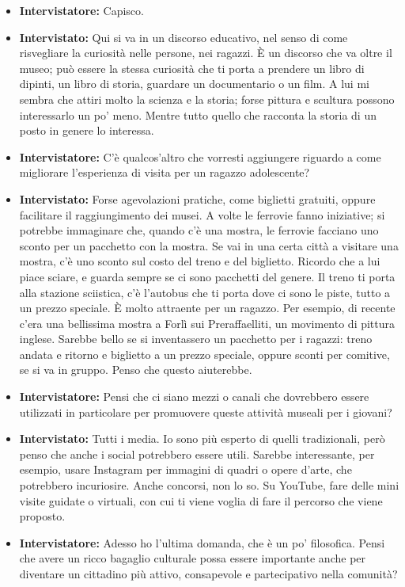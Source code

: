 \documentclass{article}
\begin{document}
\begin{itemize}
    \item \textbf{Intervistatore:} Capisco.
    \item \textbf{Intervistato:} Qui si va in un discorso educativo, nel senso di come risvegliare la curiosità nelle persone, nei ragazzi. È un discorso che va oltre il museo; può essere la stessa curiosità che ti porta a prendere un libro di dipinti, un libro di storia, guardare un documentario o un film. A lui mi sembra che attiri molto la scienza e la storia; forse pittura e scultura possono interessarlo un po' meno. Mentre tutto quello che racconta la storia di un posto in genere lo interessa.
    \item \textbf{Intervistatore:} C'è qualcos'altro che vorresti aggiungere riguardo a come migliorare l'esperienza di visita per un ragazzo adolescente?
    \item \textbf{Intervistato:} Forse agevolazioni pratiche, come biglietti gratuiti, oppure facilitare il raggiungimento dei musei. A volte le ferrovie fanno iniziative; si potrebbe immaginare che, quando c'è una mostra, le ferrovie facciano uno sconto per un pacchetto con la mostra. Se vai in una certa città a visitare una mostra, c'è uno sconto sul costo del treno e del biglietto. Ricordo che a lui piace sciare, e guarda sempre se ci sono pacchetti del genere. Il treno ti porta alla stazione sciistica, c'è l'autobus che ti porta dove ci sono le piste, tutto a un prezzo speciale. È molto attraente per un ragazzo. Per esempio, di recente c'era una bellissima mostra a Forlì sui Preraffaelliti, un movimento di pittura inglese. Sarebbe bello se si inventassero un pacchetto per i ragazzi: treno andata e ritorno e biglietto a un prezzo speciale, oppure sconti per comitive, se si va in gruppo. Penso che questo aiuterebbe.
    \item \textbf{Intervistatore:} Pensi che ci siano mezzi o canali che dovrebbero essere utilizzati in particolare per promuovere queste attività museali per i giovani?
    \item \textbf{Intervistato:} Tutti i media. Io sono più esperto di quelli tradizionali, però penso che anche i social potrebbero essere utili. Sarebbe interessante, per esempio, usare Instagram per immagini di quadri o opere d'arte, che potrebbero incuriosire. Anche concorsi, non lo so. Su YouTube, fare delle mini visite guidate o virtuali, con cui ti viene voglia di fare il percorso che viene proposto.
    \item \textbf{Intervistatore:} Adesso ho l'ultima domanda, che è un po' filosofica. Pensi che avere un ricco bagaglio culturale possa essere importante anche per diventare un cittadino più attivo, consapevole e partecipativo nella comunità?

\end{itemize}
\end{document}
